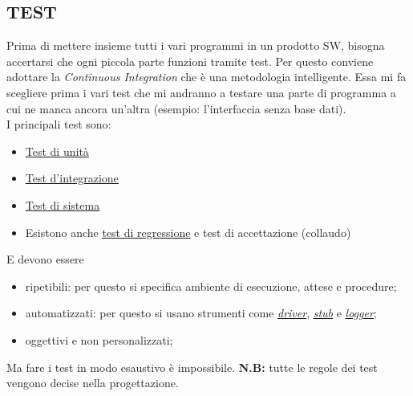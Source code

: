 		\subsection{TEST} 	\label{test}	%
		Prima di mettere insieme tutti i vari programmi in un prodotto SW, bisogna accertarsi che ogni piccola parte funzioni tramite test. %
		Per questo conviene adottare la \textit{Continuous Integration} che è una metodologia intelligente. Essa mi fa scegliere prima i vari test che mi andranno a testare una parte di programma a cui ne manca ancora un'altra (esempio: l'interfaccia senza base dati). \\
		I principali test sono:
		\begin{itemize}
			\item \underline{\hyperref[testunita]{Test di unità}}
			\item \underline{\hyperref[testintegrazione]{Test d'integrazione}}
			\item \underline{\hyperref[testsistema]{Test di sistema}}
			\item Esistono anche \underline{\hyperref[testregressione]{test di regressione}} e test di accettazione (collaudo)
		\end{itemize}
		E devono essere 
		\begin{itemize}
			\item ripetibili: per questo si specifica ambiente di esecuzione, attese e procedure;
			\item automatizzati: per questo si usano strumenti come \textit{\underline{\hyperref[driver]{driver}}}, \textit{\underline{\hyperref[stub]{stub}}} e \textit{\underline{\hyperref[logger]{logger}}};
			\item oggettivi e non personalizzati;
		\end{itemize}
		Ma fare i test in modo esaustivo è impossibile.
		\textbf{N.B:} tutte le regole dei test vengono decise nella progettazione.
		
